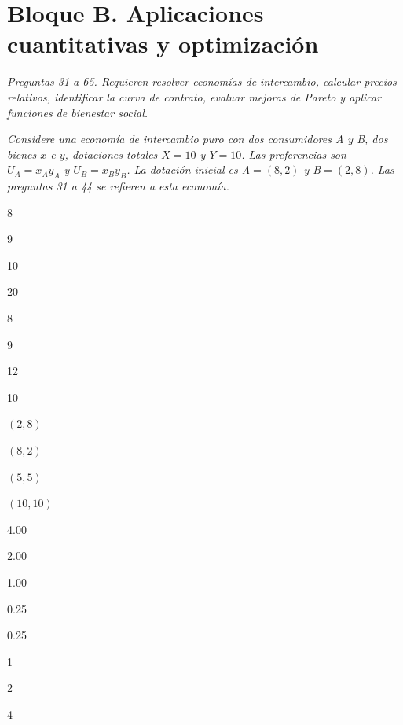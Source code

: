 \section*{Bloque B. Aplicaciones cuantitativas y optimización}

\noindent\textit{Preguntas 31 a 65. Requieren resolver economías de intercambio, calcular precios relativos, identificar la curva de contrato, evaluar mejoras de Pareto y aplicar funciones de bienestar social.}

\noindent\textit{Considere una economía de intercambio puro con dos consumidores A y B, dos bienes $x$ e $y$, dotaciones totales $X=10$ y $Y=10$. Las preferencias son $U_A=x_Ay_A$ y $U_B=x_By_B$. La dotación inicial es A$=(8,2)$ y B$=(2,8)$. Las preguntas 31 a 44 se refieren a esta economía.}

\begin{opts}
    \item 8
    \item 9
    \item 10
    \item 20
\end{opts}

\begin{opts}
    \item 8
    \item 9
    \item 12
    \item 10
\end{opts}

\begin{opts}
    \item $(2,8)$
    \item $(8,2)$
    \item $(5,5)$
    \item $(10,10)$
\end{opts}

\begin{opts}
    \item 4.00
    \item 2.00
    \item 1.00
    \item 0.25
\end{opts}

\begin{opts}
    \item 0.25
    \item 1
    \item 2
    \item 4
\end{opts}

